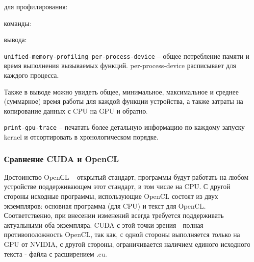  для профилирования:

 команды:

 вывода: \\
\noindent{}

\texttt{{\textendash\textendash}unified-memory-profiling per-process-device} -- общее потребление памяти и время выполнения вызываемых функций. per-process-device расписывает для каждого процесса.

Также в выводе можно увидеть общее, минимальное, максимальное и среднее (суммарное) время работы для каждой функции устройства, а также затраты на копирование данных с CPU на GPU и обратно.

\texttt{{\textendash\textendash}print-gpu-trace} -- печатать более детальную информацию по каждому запуску kernel и отсортировать в хронологическом порядке.

\subsubsection*{Сравнение CUDA и OpenCL}
Достоинство OpenСL -- открытый стандарт, программы будут работать на любом устройстве поддерживающем этот стандарт, в том числе на CPU. С другой стороны исходные программы, использующие OpenCL состоят из двух экземпляров: основная программа (для CPU) и текст для OpenCL. Соответственно, при внесении изменений всегда требуется поддерживать актуальными оба экземпляра. CUDA с этой точки зрения - полная противоположность OpenCL, так как, с одной стороны выполняется только на GPU от NVIDIA, с другой стороны, ограничивается наличием единого исходного текста - файла с расширением .cu.

